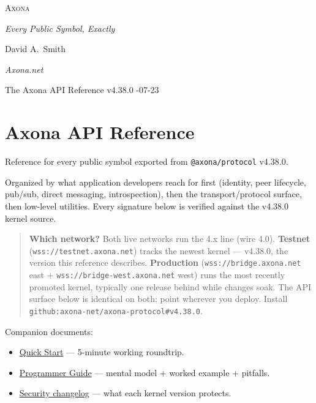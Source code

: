 \documentclass[
  nobib]{tufte-handout}
\author{}
\date{}
\providecommand{\tightlist}{%
  \setlength{\itemsep}{0pt}\setlength{\parskip}{0pt}}
\begin{document}
\thispagestyle{empty}
\null\vfill
\begin{center}
{\fontsize{48}{52}\selectfont \textsc{Axona}\par}
\vspace{0.6em}
{\Large\itshape Every Public Symbol, Exactly\par}
\vspace{4em}
{\large David A.~Smith\par}
{\itshape\small Axona.net\par}
\vspace{2em}
{\small The Axona API Reference \quad v4.38.0 -07-23\par}
\end{center}
\vfill
\null
\newpage
\pagestyle{ndhtplain}
\thispagestyle{ndhtplain}
\setcounter{page}{1}

\section{Axona API Reference}\label{axona-api-reference}

Reference for every public symbol exported from \texttt{@axona/protocol}
v4.38.0.

Organized by what application developers reach for first (identity, peer
lifecycle, pub/sub, direct messaging, introspection), then the
transport/protocol surface, then low-level utilities. Every signature
below is verified against the v4.38.0 kernel source.

\begin{quote}
\textbf{Which network?} Both live networks run the 4.x line (wire 4.0).
\textbf{Testnet} (\texttt{wss://testnet.axona.net}) tracks the newest
kernel --- v4.38.0, the version this reference describes.
\textbf{Production} (\texttt{wss://bridge.axona.net} east +
\texttt{wss://bridge-west.axona.net} west) runs the most recently
promoted kernel, typically one release behind while changes soak. The
API surface below is identical on both; point wherever you deploy.
Install \texttt{github:axona-net/axona-protocol\#v4.38.0}.
\end{quote}

Companion documents:

\begin{itemize}
\tightlist
\item
  \href{Quick-Start-v4.38.0.md}{Quick Start} --- 5-minute working
  roundtrip.
\item
  \href{Axona-Programmer-Guide-v4.38.0.md}{Programmer Guide} --- mental
  model + worked example + pitfalls.
\item
  \href{../SECURITY-CHANGELOG.md}{Security changelog} --- what each
  kernel version protects.
\end{itemize}
\end{document}
